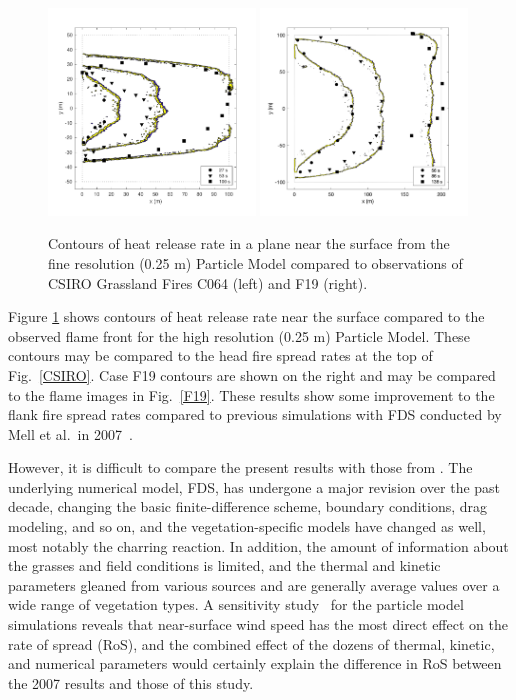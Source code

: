 \documentclass[journal,article,atmosphere,submit,moreauthors,pdftex]{Definitions/mdpi}
\begin{document}
\begin{figure}[ht]
\includegraphics[width=0.49\textwidth]{figures/Case_C064_flame_position.pdf}
\includegraphics[width=0.49\textwidth]{figures/Case_F19_flame_position.pdf}
\caption{Contours of heat release rate in a plane near the surface from the fine resolution (0.25 m) Particle Model compared to observations of CSIRO Grassland Fires C064 (left) and F19 (right).}
\label{fig:CaseF19_contours}
\end{figure}

Figure \ref{fig:CaseF19_contours} shows contours of heat release rate near the surface compared to the observed flame front for the high resolution (0.25 m) Particle Model.  These contours may be compared to the head fire spread rates at the top of Fig.~\ref{CSIRO}.  Case F19 contours are shown on the right and may be compared to the flame images in Fig.~\ref{F19}.  These results show some improvement to the flank fire spread rates compared to previous simulations with FDS conducted by Mell et al.~in 2007~\cite{Mell:IJWF2007}.

However, it is difficult to compare the present results with those from \cite{Mell:IJWF2007}. The underlying numerical model, FDS, has undergone a major revision over the past decade, changing the basic finite-difference scheme, boundary conditions, drag modeling, and so on, and the vegetation-specific models have changed as well, most notably the charring reaction. In addition, the amount of information about the grasses and field conditions is limited, and the thermal and kinetic parameters gleaned from various sources and are generally average values over a wide range of vegetation types. A sensitivity study~\cite{McGrattan:CI2017} for the particle model simulations reveals that near-surface wind speed has the most direct effect on the rate of spread (RoS), and the combined effect of the dozens of thermal, kinetic, and numerical parameters would certainly explain the difference in RoS between the 2007 results and those of this study. 
\end{document}
